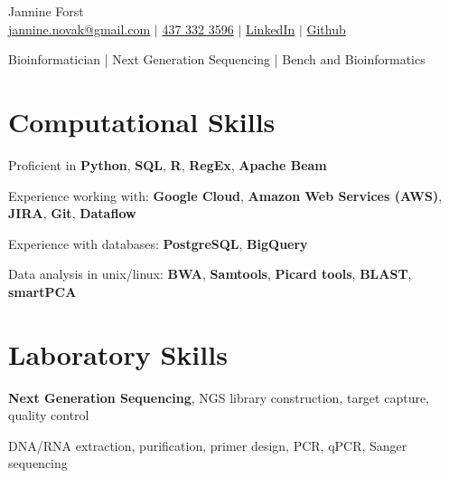 \documentclass[11pt]{article}
\begin{document}
\begin{center}
    {\fontsize{36}{36}\selectfont\intermedium Jannine Forst} \\ \bigskip
    {\color{icnclr}\faEnvelope[regular]} \href{mailto:jannine.novak@gmail.com}{jannine.novak@gmail.com} $|$ 
    {\color{icnclr}} \href{tel:1234567890}{437 332 3596} $|$
    \href{https://www.linkedin.com/in/jannine-forst/}{\color{icnclr}\faLinkedin} 
    \href{https://www.linkedin.com/in/jannine-forst/} {LinkedIn} $|$
    \href{https://github.com/jannine-forst}
    {\color{icnclr}\faGithub} \href{https://github.com/jannine-forst} {Github}
    

    \item{Bioinformatician | Next Generation Sequencing | Bench and Bioinformatics}
\end{center}

\section{Computational Skills}
\begin{description}
    \item Proficient in \textbf{Python}, \textbf{SQL}, \textbf{R}, \textbf{RegEx}, \textbf{Apache Beam}
    \item Experience working with: \textbf{Google Cloud}, \textbf{Amazon Web Services (AWS)}, \textbf{JIRA}, \textbf{Git}, \textbf{Dataflow}
    \item Experience with databases: \textbf{PostgreSQL}, \textbf{BigQuery}
    \item Data analysis in unix/linux: \textbf{BWA}, \textbf{Samtools}, \textbf{Picard tools}, \textbf{BLAST}, \textbf{smartPCA}
\end{description}

\section{Laboratory Skills}
\begin{description}
    \item \textbf{Next Generation Sequencing}, NGS library construction, target capture, quality control
    \item DNA/RNA extraction, purification, primer design, PCR, qPCR, Sanger sequencing
\end{description}
\end{document}
